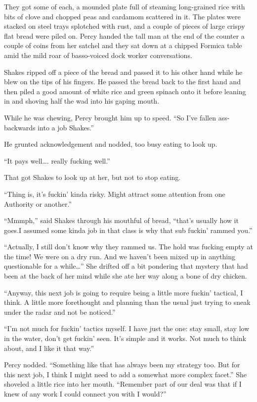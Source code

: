 \documentclass[]{scrbook}
\begin{document}
They got some of each, a mounded plate full of steaming long-grained
rice with bits of clove and chopped peas and cardamom scattered in it.
The plates were stacked on steel trays splotched with rust, and a couple
of pieces of large crispy flat bread were piled on. Percy handed the
tall man at the end of the counter a couple of coins from her satchel
and they sat down at a chipped Formica table amid the mild roar of
basso-voiced dock worker conversations.

Shakes ripped off a piece of the bread and passed it to his other hand
while he blew on the tips of his fingers. He passed the bread back to
the first hand and then piled a good amount of white rice and green
spinach onto it before leaning in and shoving half the wad into his
gaping mouth.

While he was chewing, Percy brought him up to speed. ``So I've fallen
ass-backwards into a job Shakes.''

He grunted acknowledgement and nodded, too busy eating to look up.

``It pays well\ldots{}. really fucking well.''

That got Shakes to look up at her, but not to stop eating.

``Thing is, it's fuckin' kinda risky. Might attract some attention from
one Authority or another.''

``Mmmph,'' said Shakes through his mouthful of bread, ``that's usually
how it goes.I assumed some kinda job in that class is why that sub
fuckin' rammed you.''

``Actually, I still don't know why they rammed us. The hold was fucking
empty at the time! We were on a dry run. And we haven't been mixed up in
anything questionable for a while\ldots{}'' She drifted off a bit
pondering that mystery that had been at the back of her mind while she
ate her way along a bone of dry chicken.

``Anyway, this next job is going to require being a little more fuckin'
tactical, I think. A little more forethought and planning than the usual
just trying to sneak under the radar and not be noticed.''

``I'm not much for fuckin' tactics myself. I have just the one: stay
small, stay low in the water, don't get fuckin' seen. It's simple and it
works. Not much to think about, and I like it that way.''

Percy nodded. ``Something like that has always been my strategy too. But
for this next job, I think I might need to add a somewhat more complex
facet.'' She shoveled a little rice into her mouth. ``Remember part of
our deal was that if I knew of any work I could connect you with I
would?''
\end{document}
